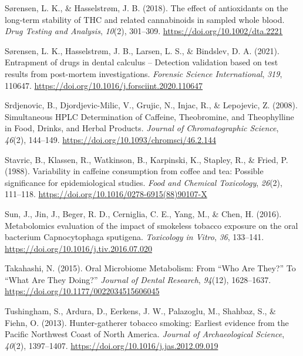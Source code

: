 \documentclass[
  letterpaper,
]{book}
\newlength{\cslhangindent}
\newlength{\cslentryspacingunit} %
\newenvironment{CSLReferences}[2] %
 {%
  \setlength{\parindent}{0pt}
  \ifodd #1
  \let\oldpar\par
  \def\par{\hangindent=\cslhangindent\oldpar}
  \fi
  \setlength{\parskip}{#2\cslentryspacingunit}
 }%
 {}
\begin{document}
\begin{CSLReferences}{1}{0}
\leavevmode{}%
Sørensen, L. K., \& Hasselstrøm, J. B. (2018). The effect of
antioxidants on the long-term stability of {THC} and related
cannabinoids in sampled whole blood. \emph{Drug Testing and Analysis},
\emph{10}(2), 301--309. \url{https://doi.org/10.1002/dta.2221}

\leavevmode{}%
Sørensen, L. K., Hasselstrøm, J. B., Larsen, L. S., \& Bindslev, D. A.
(2021). Entrapment of drugs in dental calculus -- {Detection} validation
based on test results from post-mortem investigations. \emph{Forensic
Science International}, \emph{319}, 110647.
\url{https://doi.org/10.1016/j.forsciint.2020.110647}

\leavevmode{}%
Srdjenovic, B., Djordjevic-Milic, V., Grujic, N., Injac, R., \&
Lepojevic, Z. (2008). Simultaneous {HPLC Determination} of {Caffeine},
{Theobromine}, and {Theophylline} in {Food}, {Drinks}, and {Herbal
Products}. \emph{Journal of Chromatographic Science}, \emph{46}(2),
144--149. \url{https://doi.org/10.1093/chromsci/46.2.144}

\leavevmode{}%
Stavric, B., Klassen, R., Watkinson, B., Karpinski, K., Stapley, R., \&
Fried, P. (1988). Variability in caffeine consumption from coffee and
tea: {Possible} significance for epidemiological studies. \emph{Food and
Chemical Toxicology}, \emph{26}(2), 111--118.
\url{https://doi.org/10.1016/0278-6915(88)90107-X}

\leavevmode{}%
Sun, J., Jin, J., Beger, R. D., Cerniglia, C. E., Yang, M., \& Chen, H.
(2016). Metabolomics evaluation of the impact of smokeless tobacco
exposure on the oral bacterium {Capnocytophaga} sputigena.
\emph{Toxicology in Vitro}, \emph{36}, 133--141.
\url{https://doi.org/10.1016/j.tiv.2016.07.020}

\leavevmode{}%
Takahashi, N. (2015). Oral {Microbiome Metabolism}: {From} {``{Who Are
They}?''} To {``{What Are They Doing}?''} \emph{Journal of Dental
Research}, \emph{94}(12), 1628--1637.
\url{https://doi.org/10.1177/0022034515606045}

\leavevmode{}%
Tushingham, S., Ardura, D., Eerkens, J. W., Palazoglu, M., Shahbaz, S.,
\& Fiehn, O. (2013). Hunter-gatherer tobacco smoking: Earliest evidence
from the {Pacific Northwest Coast} of {North America}. \emph{Journal of
Archaeological Science}, \emph{40}(2), 1397--1407.
\url{https://doi.org/10.1016/j.jas.2012.09.019}


\end{CSLReferences}
\end{document}
